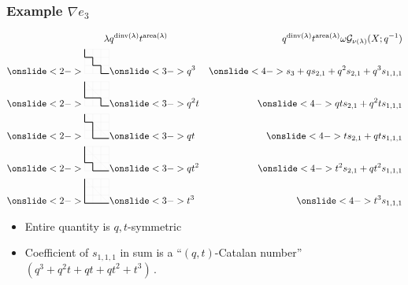 \documentclass[dvipsnames]{beamer}
\newcommand{\Gcal}{{\mathcal G}}
\DeclareMathOperator{\dinv}{dinv}
\DeclareMathOperator{\area}{area}
\theoremstyle{definition}
\newcounter{c}
\begin{document}
\begin{frame}
  \frametitle{Example \(\nabla e_3\)}
  \vspace{-2em}
  \begin{eqnarray*}
    \lambda
    & q^{\dinv(\lambda)}t^{\area(\lambda)}
    & q^{\dinv(\lambda)}t^{\area(\lambda)}\omega \Gcal_{\nu(\lambda)}(X;q^{-1})\\
      \onslide<2->{\begin{tikzpicture}[xscale = 0.3,yscale = 0.3]
      \draw[step=1cm,gray!20,very thin] (0,0) grid (3,3);
      \draw[step=1cm,gray!20,very thin] (0,3)--(3,0); \draw[thick]
      (0,3)--(0,2)--(1,2)--(1,1)--(2,1)--(2,0)--(3,0);
    \end{tikzpicture}}
    & \onslide<3->{q^3}
    & \onslide<4->{s_3+qs_{2,1}+q^2s_{2,1}+q^3s_{1,1,1}}\\
    \onslide<2->
    {
    \begin{tikzpicture}[xscale = 0.3,yscale = 0.3]
      \draw[step=1cm,gray!20,very thin] (0,0) grid (3,3);
      \draw[step=1cm,gray!20,very thin] (0,3)--(3,0); \draw[thick]
      (0,3)--(0,1)--(2,1)--(2,0)--(3,0);
    \end{tikzpicture}
    }
    & \onslide<3->{q^2t}
    & \onslide<4->{qts_{2,1}+q^2ts_{1,1,1}}  \\
    \onslide<2->
    {
    \begin{tikzpicture}[xscale = 0.3,yscale = 0.3]
      \draw[step=1cm,gray!20,very thin] (0,0) grid (3,3);
      \draw[step=1cm,gray!20,very thin] (0,3)--(3,0); \draw[thick]
      (0,3)--(0,2)--(1,2)--(1,0)--(3,0);
    \end{tikzpicture}
    }
    & \onslide<3->{qt}
    & \onslide<4->{ts_{2,1}+qts_{1,1,1}}\\
    \onslide<2->
    {
    \begin{tikzpicture}[xscale = 0.3,yscale = 0.3]
      \draw[step=1cm,gray!20,very thin] (0,0) grid (3,3);
      \draw[step=1cm,gray!20,very thin] (0,3)--(3,0); \draw[thick]
      (0,3)--(0,1)--(1,1)--(1,0)--(3,0);
    \end{tikzpicture}
    }
    &\onslide<3->{qt^2}
    &\onslide<4->{ t^2 s_{2,1}+qt^2s_{1,1,1}}\\
    \onslide<2->
    {
    \begin{tikzpicture}[xscale = 0.3,yscale = 0.3]
      \draw[step=1cm,gray!20,very thin] (0,0) grid (3,3);
      \draw[step=1cm,gray!20,very thin] (0,3)--(3,0); \draw[thick]
      (0,3)--(0,0)--(3,0);
    \end{tikzpicture}
    }
    &\onslide<3->{t^3}
    & \onslide<4->{t^3s_{1,1,1}}
  \end{eqnarray*}
  \vspace{-0.75em}
  \begin{itemize}
  \item<5-> Entire quantity is \(q,t\)-symmetric
  \item<6-> Coefficient of \(s_{1,1,1}\) in sum is a ``\((q,t)\)-Catalan
    number'' \((q^3+q^2t+qt+qt^2+t^3)\)\,.
  \end{itemize}
\end{frame}
\end{document}
